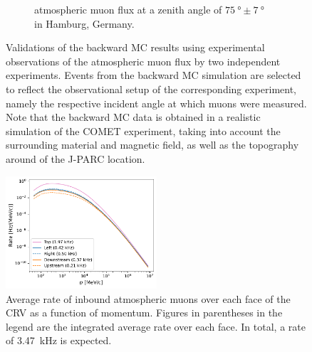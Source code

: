 \begin{figure}
\begin{subfigure}[t]{0.49\textwidth}
{            atmospheric muon flux at a zenith angle of $\SI{75}{\degree} \pm
            \SI{7}{\degree}$~\cite{kieldesy} in Hamburg, Germany.}
    \end{subfigure}
    \caption{
        Validations of the backward MC results using experimental observations of the
        atmospheric muon flux by two independent experiments. Events from the
        backward MC simulation are selected to reflect the observational setup of
        the corresponding experiment, namely the respective incident angle at
        which muons were measured. Note that the backward MC data is obtained in
        a realistic simulation of the COMET experiment, taking into account the
        surrounding material and magnetic field, as well as the topography
        around of the J-PARC location.
    }
    \label{fig:bmc_validations}
\end{figure}

\begin{figure}
    \centering
    \includegraphics[width=0.5\textwidth]{chapter5/rate_vs_p.pdf}
    \caption{
        Average rate of inbound atmospheric muons over each face of the CRV as a
        function of momentum. Figures in parentheses in the legend are the
        integrated average rate over each face. In total, a rate of
        \SI{3.47}{\kHz} is expected.
    }
    \label{fig:avg_rate_per_face}
\end{figure}
